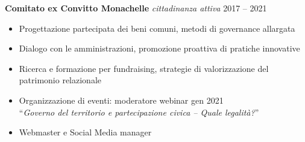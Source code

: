 \documentclass[a4paper]{article}
\begin{document}
\vspace*{2mm}
\textbf{Comitato ex Convitto Monachelle}
{\sl cittadinanza attiva} \hfill 2017 -- 2021\\
\begin{itemize} \itemsep 1pt
  \item Progettazione partecipata dei beni comuni, metodi di governance allargata
  \item Dialogo con le amministrazioni, promozione proattiva di pratiche innovative
  \item Ricerca e formazione per fundraising, strategie di valorizzazione del patrimonio relazionale
  \item Organizzazione di eventi:
        moderatore webinar gen 2021 \\
        ``\textit{Governo del territorio e partecipazione civica – Quale legalità?}''
  \item Webmaster e Social Media manager
\end{itemize}
\end{document}
